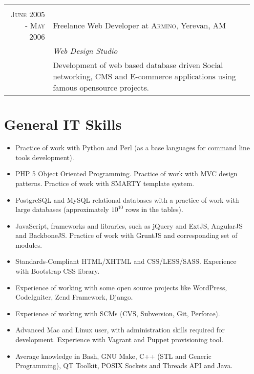 \documentclass[a4paper,10pt]{article}
\begin{document}
\begin{tabular}{r|p{11cm}}
\multicolumn{2}{c}{} \\


\textsc{June 2005 - May 2006}
  & Freelance Web Developer at \textsc{Armino}, Yerevan, AM \\ 
  & \emph{Web Design Studio}\\
  & \footnotesize{Development of web based database driven Social networking,
    CMS and E-commerce applications using famous opensource projects.}

\end{tabular}


\section{General IT Skills}
\begin{itemize}
  \item[] Practice of work with Python and Perl (as a base languages for
          command line tools development).
  \item[] PHP 5 Object Oriented Programming. Practice of work with MVC design
          patterns. Practice of work with SMARTY template system.
  \item[] PostgreSQL and MySQL relational databases with a practice of work
          with large databases (approximately $10^10$ rows in the tables).
  \item[] JavaScript, frameworks and libraries, such as jQuery and ExtJS,
          AngularJS and BackboneJS. Practice of work with GruntJS and
          corresponding set of modules.
  \item[] Standards-Compliant HTML/XHTML and CSS/LESS/SASS. Experience with
          Bootstrap CSS library.
  \item[] Experience of working with some open source projects like WordPress,
          CodeIgniter, Zend Framework, Django.
  \item[] Experience of working with SCMs (CVS, Subversion, Git, Perforce).
  \item[] Advanced Mac and Linux user, with administration skills required for
          development. Experience with Vagrant and Puppet provisioning tool.
  \item[] Average knowledge in Bash, GNU Make, C++ (STL and Generic
          Programming), QT Toolkit, POSIX Sockets and Threads API and Java.
\end{itemize}


\end{document}
